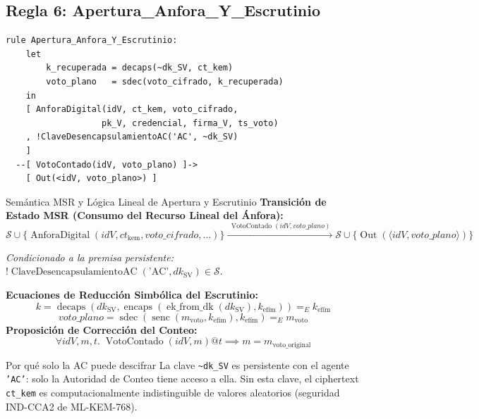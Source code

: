\documentclass[12pt, a4paper, twoside, openright]{book}
\begin{document}
\subsection{Regla 6: Apertura\_Anfora\_Y\_Escrutinio}

\begin{lstlisting}[caption={La AC desencapsula el secreto KEM y descifra el voto.}]
rule Apertura_Anfora_Y_Escrutinio:
    let
        k_recuperada = decaps(~dk_SV, ct_kem)
        voto_plano   = sdec(voto_cifrado, k_recuperada)
    in
    [ AnforaDigital(idV, ct_kem, voto_cifrado,
                   pk_V, credencial, firma_V, ts_voto)
    , !ClaveDesencapsulamientoAC('AC', ~dk_SV)
    ]
  --[ VotoContado(idV, voto_plano) ]->
    [ Out(<idV, voto_plano>) ]
\end{lstlisting}

\begin{cajaLogica}{Sem\'antica MSR y L\'ogica Lineal de Apertura y Escrutinio}
  \textbf{Transici\'on de Estado MSR (Consumo del Recurso Lineal del \'Anfora):}
  \[
    \mathcal{S} \cup \{ \operatorname{AnforaDigital}(\mathit{idV}, \mathit{ct}_{\text{kem}}, \mathit{voto\_cifrado}, \dots) \}
    \xrightarrow{\;\operatorname{VotoContado}(\mathit{idV}, \mathit{voto\_plano})\;}
    \mathcal{S} \cup \{ \operatorname{Out}(\langle \mathit{idV}, \mathit{voto\_plano} \rangle) \}
  \]
  \par\smallskip\noindent\textit{Condicionado a la premisa persistente:} $!\operatorname{ClaveDesencapsulamientoAC}(\text{'AC'}, \mathit{dk}_{\mathrm{SV}}) \in \mathcal{S}$.\par\medskip
  \textbf{Ecuaciones de Reducci\'on Simb\'olica del Escrutinio:}
  \[
    \mathit{k} = \operatorname{decaps}(\mathit{dk}_{\mathrm{SV}}, \operatorname{encaps}(\operatorname{ek\_from\_dk}(\mathit{dk}_{\mathrm{SV}}), \mathit{k}_{\text{ef\'im}})) =_E \mathit{k}_{\text{ef\'im}}
  \]
  \[
    \mathit{voto\_plano} = \operatorname{sdec}(\operatorname{senc}(\mathit{m}_{\text{voto}}, \mathit{k}_{\text{ef\'im}}), \mathit{k}_{\text{ef\'im}}) =_E \mathit{m}_{\text{voto}}
  \]
  \textbf{Proposici\'on de Correcci\'on del Conteo:}
  \[
    \forall \mathit{idV}, \mathit{m}, t.\; \operatorname{VotoContado}(\mathit{idV}, \mathit{m})@t \implies
    \mathit{m} = \mathit{m}_{\text{voto\_original}}
  \]
\end{cajaLogica}

\begin{cajaDef}{Por qu\'e solo la AC puede descifrar}
  La clave \texttt{\textasciitilde dk\_SV} es persistente con el
  agente \texttt{'AC'}: solo la Autoridad de Conteo tiene acceso a ella.
  Sin esta clave, el ciphertext \texttt{ct\_kem} es computacionalmente
  indistinguible de valores aleatorios (seguridad IND-CCA2 de ML-KEM-768).
\end{cajaDef}
\end{document}
